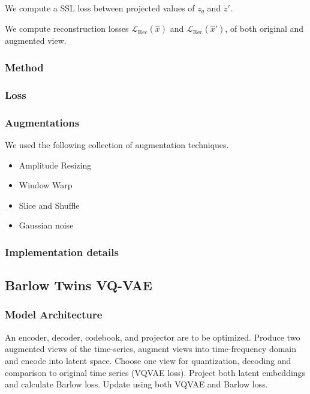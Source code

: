 \documentclass[../../thesis.tex]{subfiles}
\begin{document}
We compute a SSL loss between projected values of $z_q$ and $z'$. \newline

We compute reconstruction losses $\mathcal{L}_{\text{Rec}}(\hat{x})$ and $\mathcal{L}_{\text{Rec}}(\hat{x}')$, of both original and augmented view. 


\subsubsection{Method}

\subsubsection{Loss}


\subsubsection{Augmentations}
We used the following collection of augmentation techniques.
\begin{itemize}
    \item Amplitude Resizing
    \item Window Warp
    \item Slice and Shuffle
    \item Gaussian noise
\end{itemize}

\subsubsection{Implementation details}

\subsection{Barlow Twins VQ-VAE}

\subsubsection{Model Architecture}


An encoder, decoder, codebook, and projector are to be optimized. Produce two augmented views of the time-series, augment views into time-frequency domain and encode into latent space. Choose one view for quantization, decoding and comparison to original time series (VQVAE loss). Project both latent embeddings and calculate Barlow loss. Update using both VQVAE and Barlow loss.
\end{document}
